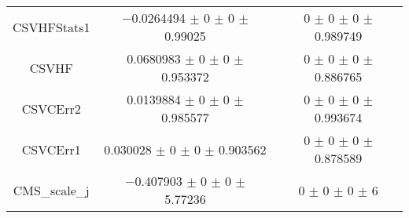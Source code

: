 \begin{table}
\begin{tabular}{ccc}
CSVHFStats1 	& \num{-0.0264494} $\pm$ \num{0} $\pm$ \num{0} $\pm$ \num{0.99025} 	& \num{0} $\pm$ \num{0} $\pm$ \num{0} $\pm$ \num{0.989749}\\
CSVHF 	& \num{0.0680983} $\pm$ \num{0} $\pm$ \num{0} $\pm$ \num{0.953372} 	& \num{0} $\pm$ \num{0} $\pm$ \num{0} $\pm$ \num{0.886765}\\
CSVCErr2 	& \num{0.0139884} $\pm$ \num{0} $\pm$ \num{0} $\pm$ \num{0.985577} 	& \num{0} $\pm$ \num{0} $\pm$ \num{0} $\pm$ \num{0.993674}\\
CSVCErr1 	& \num{0.030028} $\pm$ \num{0} $\pm$ \num{0} $\pm$ \num{0.903562} 	& \num{0} $\pm$ \num{0} $\pm$ \num{0} $\pm$ \num{0.878589}\\
CMS\_scale\_j 	& \num{-0.407903} $\pm$ \num{0} $\pm$ \num{0} $\pm$ \num{5.77236} 	& \num{0} $\pm$ \num{0} $\pm$ \num{0} $\pm$ \num{6}\\
\bottomrule
\end{tabular}
\end{table}